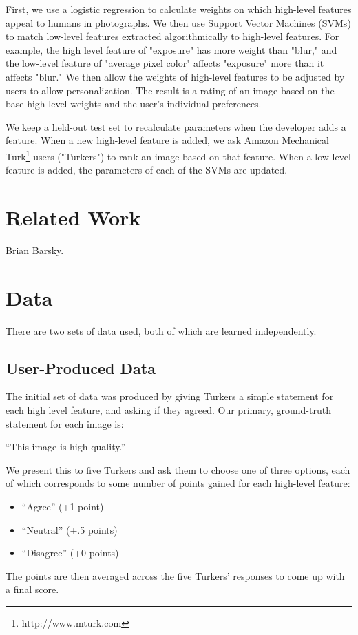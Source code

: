 \documentclass[10pt,twocolumn]{article}
\begin{document}
First, we use a logistic regression to calculate weights on which high-level features appeal to humans in photographs. We then use Support Vector Machines (SVMs) to match low-level features extracted algorithmically to high-level features. For example, the high level feature of "exposure" has more weight than "blur," and the low-level feature of "average pixel color" affects "exposure" more than it affects "blur." We then allow the weights of high-level features to be adjusted by users to allow personalization. The result is a rating of an image based on the base high-level weights and the user's individual preferences.

We keep a held-out test set to recalculate parameters when the developer adds a feature. When a new high-level feature is added, we ask Amazon Mechanical Turk\footnote{http://www.mturk.com} users ("Turkers") to rank an image based on that feature. When a low-level feature is added, the parameters of each of the SVMs are updated.

\section{Related Work}
Brian Barsky.

\section{Data}

There are two sets of data used, both of which are learned independently.

\subsection{User-Produced Data}
The initial set of data was produced by giving Turkers a simple statement for each high level feature, and asking if they agreed. Our primary, ground-truth statement for each image is:

``This image is high quality.''

We present this to five Turkers and ask them to choose one of three options, each of which corresponds to some number of points gained for each high-level feature:

\begin{itemize}
\item ``Agree'' (+1 point)
\item ``Neutral'' (+.5 points)
\item ``Disagree'' (+0 points)
\end{itemize}
The points are then averaged across the five Turkers' responses to come up with a final score.
\end{document}

